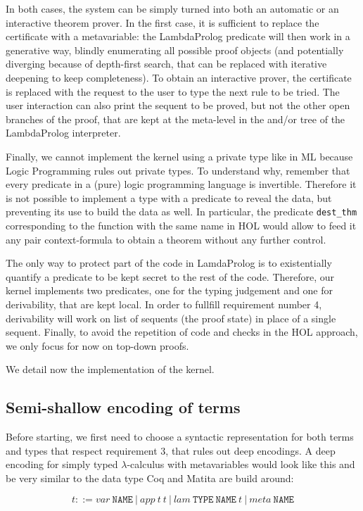 \documentclass[preprint]{sigplanconf}
\begin{document}
In both cases, the system can be simply turned into both an automatic or an interactive theorem prover. In the first case, it is sufficient to replace the certificate with a metavariable: the LambdaProlog predicate will then work in a generative way, blindly enumerating all possible proof objects (and potentially diverging because of depth-first search, that can be replaced with iterative deepening to keep completeness). To obtain an interactive prover, the certificate is replaced with the request to the user to type the next rule to be tried. The user interaction can also print the sequent to be proved, but not the other open branches of the proof, that are kept at the meta-level in the and/or tree of the LambdaProlog interpreter.

Finally, we cannot implement the kernel using a private type like in ML because Logic Programming rules out private types. To understand why, remember that every predicate in a (pure) logic programming language is invertible. Therefore it is not possible to implement a type with a predicate to reveal the data, but preventing its use to build the data as well. In particular, the predicate \verb+dest_thm+ corresponding to the function with the same name in HOL would allow to feed it any pair context-formula to obtain a theorem without any further control.

The only way to protect part of the code in LamdaProlog is to existentially quantify a predicate to be kept secret to the rest of the code. Therefore, our kernel implements two predicates, one for the typing judgement and one for derivability, that are kept local. In order to fullfill requirement number 4, derivability will work on list of sequents (the proof state) in place of a single sequent. Finally, to avoid the repetition of code and checks in the HOL approach, we only focus for now on top-down proofs.

We detail now the implementation of the kernel.

\subsection{Semi-shallow encoding of terms}
Before starting, we first need to choose a syntactic representation for both
terms and types that respect requirement 3, that rules out deep encodings.
A deep encoding for simply typed $\lambda$-calculus with metavariables would
look like this and be very similar to the data type Coq and Matita are build around:

$$ t ::= var~\mathtt{NAME} ~|~ app~t~t ~|~ lam~\mathtt{TYPE}~\mathtt{NAME}~t ~|~ meta~\mathtt{NAME}$$
\end{document}
